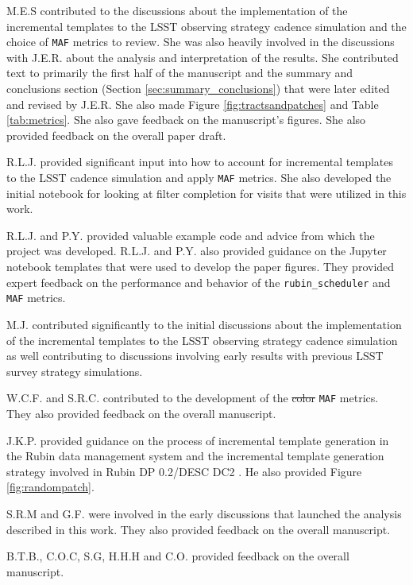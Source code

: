 \documentclass[preprintm,linenumbers]{aastex631}
\newcommand{\rubinscheduler}{\texttt{rubin\_scheduler}\xspace}
\newcommand{\maf}{\texttt{MAF}\xspace}
\begin{document}
M.E.S contributed to the discussions about the implementation of the incremental templates to the LSST observing strategy cadence simulation and the choice of \maf metrics to review.  She was also heavily involved in the discussions with J.E.R. about the analysis and interpretation of the results. She contributed text to primarily the first half of the manuscript and the summary and conclusions section (Section \ref{sec:summary_conclusions}) that were later edited and revised by J.E.R. She also made Figure \ref{fig:tractsandpatches} and Table \ref{tab:metrics}. She also gave feedback on the manuscript's figures. She also provided feedback on the overall paper draft. 

R.L.J. provided significant input into how to account for incremental templates to the LSST cadence simulation and apply \texttt{MAF} metrics. She also developed the initial notebook for looking at filter completion for visits that were utilized in this work. 

R.L.J. and P.Y. provided valuable example code and advice from which the project was developed. R.L.J. and P.Y. also provided guidance on the Jupyter notebook templates that were used to develop the paper figures. They provided expert feedback on the performance and behavior of the \rubinscheduler and \maf metrics.

M.J. contributed significantly to the initial discussions about the implementation of the incremental templates to the LSST observing strategy cadence simulation as well contributing to discussions involving early results with previous LSST survey strategy simulations. 

W.C.F. and S.R.C. contributed to the development of the \sout{color} \maf metrics. They also provided feedback on the overall manuscript. 

J.K.P. provided guidance on the process of incremental template generation in the Rubin data management system and the incremental template generation strategy involved in Rubin DP 0.2/DESC DC2 . He also provided Figure \ref{fig:randompatch}.

S.R.M and G.F. were involved in the early discussions that launched the analysis described in this work. They also provided feedback on the overall manuscript. 

B.T.B., C.O.C, S.G, H.H.H and C.O. provided feedback on the overall manuscript. 

		\appendix
  
\end{document}
